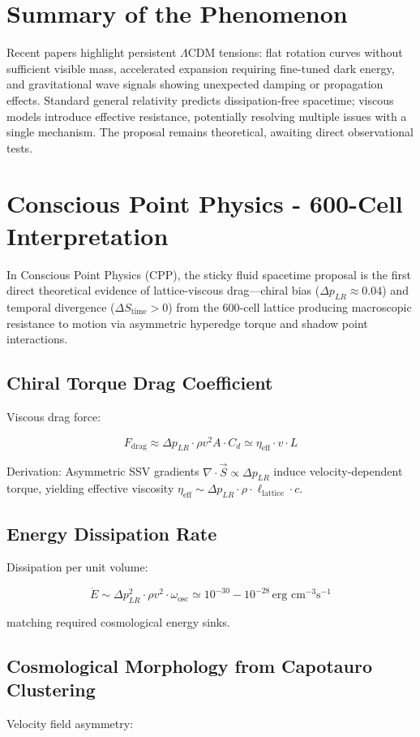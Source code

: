 \documentclass[11pt]{article}
\begin{document}
\section{Summary of the Phenomenon}
Recent papers highlight persistent $\Lambda$CDM tensions: flat rotation curves without sufficient visible mass, accelerated expansion requiring fine-tuned dark energy, and gravitational wave signals showing unexpected damping or propagation effects. Standard general relativity predicts dissipation-free spacetime; viscous models introduce effective resistance, potentially resolving multiple issues with a single mechanism. The proposal remains theoretical, awaiting direct observational tests.

\section{Conscious Point Physics - 600-Cell Interpretation}
In Conscious Point Physics (CPP), the sticky fluid spacetime proposal is the first direct theoretical evidence of lattice-viscous drag—chiral bias ($\Delta p_{LR} \approx 0.04$) and temporal divergence ($\Delta S_{\text{time}} > 0$) from the 600-cell lattice producing macroscopic resistance to motion via asymmetric hyperedge torque and shadow point interactions.

\subsection{Chiral Torque Drag Coefficient}
Viscous drag force:

\[
F_{\text{drag}} \approx \Delta p_{LR} \cdot \rho v^2 A \cdot C_d \simeq \eta_{\text{eff}} \cdot v \cdot L
\]

Derivation: Asymmetric SSV gradients $\nabla \cdot \vec{S} \propto \Delta p_{LR}$ induce velocity-dependent torque, yielding effective viscosity $\eta_{\text{eff}} \sim \Delta p_{LR} \cdot \rho \cdot \ell_{\text{lattice}} \cdot c$.

\subsection{Energy Dissipation Rate}
Dissipation per unit volume:

\[
\dot{E} \sim \Delta p_{LR}^2 \cdot \rho v^2 \cdot \omega_{\text{osc}} \simeq 10^{-30} - 10^{-28} \, \text{erg cm}^{-3} \text{s}^{-1}
\]

matching required cosmological energy sinks.

\subsection{Cosmological Morphology from Capotauro Clustering}
Velocity field asymmetry:
\end{document}
